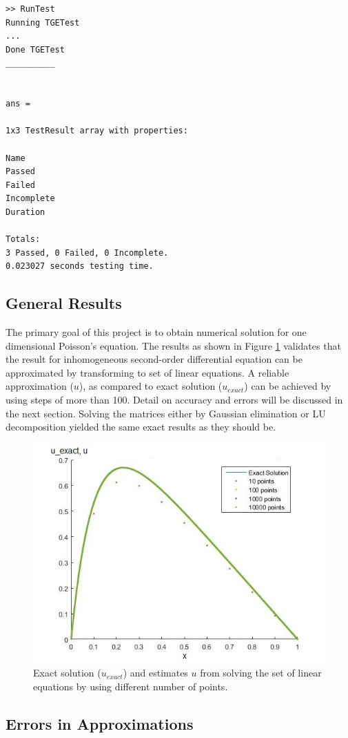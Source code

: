 \documentclass{article}
\begin{document}
  \begin{lstlisting}[frame=single]  
>> RunTest
Running TGETest
...
Done TGETest
__________


ans = 

1x3 TestResult array with properties:

Name
Passed
Failed
Incomplete
Duration

Totals:
3 Passed, 0 Failed, 0 Incomplete.
0.023027 seconds testing time.
  \end{lstlisting}
  
  \subsection{General Results}
  
  The primary goal of this project is to obtain numerical solution for one dimensional Poisson's equation. The results as shown in Figure \ref{fig:NumSoln_Matlab} validates that the result for inhomogeneous second-order differential equation can be approximated by transforming to set of linear equations. A reliable approximation ($u$), as compared to exact solution ($u_{exact}$) can be achieved by using steps of more than 100. Detail on accuracy and errors will be discussed in the next section. Solving the matrices either by Gaussian elimination or LU decomposition yielded the same exact results as they should be.
  
  \begin{figure}[h]
  	\centering
  	\includegraphics[width=0.5\linewidth]{../figures/NumSoln_Matlab}
  	\caption{Exact solution ($u_{exact}$) and estimates $u$ from solving the set of linear equations by using different number of points.}
  	\label{fig:NumSoln_Matlab}
  \end{figure}
  
  
  \subsection{Errors in Approximations}
  
\end{document}
